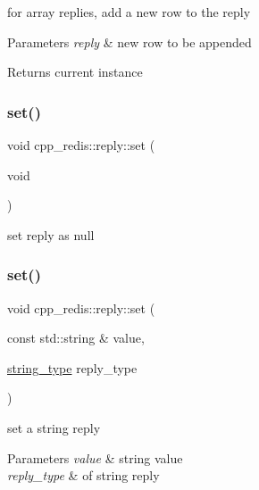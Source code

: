for array replies, add a new row to the reply


\begin{DoxyParams}{Parameters}
{\em reply} & new row to be appended \\
\hline
\end{DoxyParams}
\begin{DoxyReturn}{Returns}
current instance 
\end{DoxyReturn}
\mbox{\label{classcpp__redis_1_1reply_a2489d293128b2d567663a9d7fbbbc33e}} 
\subsubsection{\texorpdfstring{set()}{set()}\hspace{0.1cm}{\footnotesize\ttfamily [1/4]}}
{\footnotesize\ttfamily void cpp\+\_\+redis\+::reply\+::set (\begin{DoxyParamCaption}\item[{void}]{ }\end{DoxyParamCaption})}

set reply as null \mbox{\label{classcpp__redis_1_1reply_a9306dcc36a6a009a2b0f4923735f6349}} 
\subsubsection{\texorpdfstring{set()}{set()}\hspace{0.1cm}{\footnotesize\ttfamily [2/4]}}
{\footnotesize\ttfamily void cpp\+\_\+redis\+::reply\+::set (\begin{DoxyParamCaption}\item[{const std\+::string \&}]{value,  }\item[{\mbox{\hyperlink{classcpp__redis_1_1reply_ac192ba4cb8f2bb6e7cb465edf755328b}{string\+\_\+type}}}]{reply\+\_\+type }\end{DoxyParamCaption})}

set a string reply


\begin{DoxyParams}{Parameters}
{\em value} & string value \\
\hline
{\em reply\+\_\+type} & of string reply \\
\hline
\end{DoxyParams}
\mbox{\label{classcpp__redis_1_1reply_a2443bd6d4fb35279db198ba876e1ad34}} 
